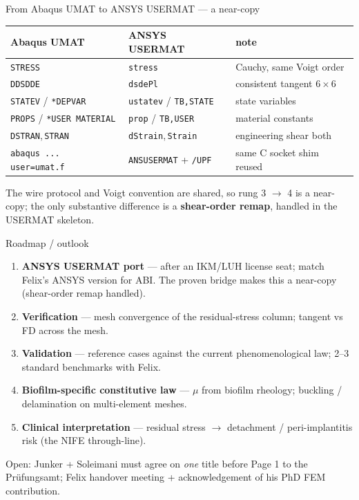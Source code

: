 \documentclass[aspectratio=169,xcolor=dvipsnames]{beamer}
\begin{document}
\begin{frame}{From Abaqus UMAT to ANSYS USERMAT — a near-copy}
\centering
\renewcommand{\arraystretch}{1.2}
\small
\begin{tabular}{l l l}
\hline
\textbf{Abaqus UMAT} & \textbf{ANSYS USERMAT} & \textbf{note}\\
\hline
\texttt{STRESS} & \texttt{stress} & Cauchy, same Voigt order\\
\texttt{DDSDDE} & \texttt{dsdePl} & consistent tangent $6\times6$\\
\texttt{STATEV} / \texttt{*DEPVAR} & \texttt{ustatev} / \texttt{TB,STATE} & state variables\\
\texttt{PROPS} / \texttt{*USER MATERIAL} & \texttt{prop} / \texttt{TB,USER} & material constants\\
\texttt{DSTRAN},\,\texttt{STRAN} & \texttt{dStrain},\,\texttt{Strain} & engineering shear both\\
\texttt{abaqus ... user=umat.f} & \texttt{ANSUSERMAT} + \texttt{/UPF} & same C socket shim reused\\
\hline
\end{tabular}
\vspace{0.6em}

\footnotesize The wire protocol and Voigt convention are shared, so rung 3 $\to$ 4 is a near-copy;
the only substantive difference is a \textbf{shear-order remap}, handled in the USERMAT skeleton.
\end{frame}

\begin{frame}{Roadmap / outlook}
\begin{enumerate}
  \item \textbf{ANSYS USERMAT port} — after an IKM/LUH license seat; match Felix's ANSYS version for
    ABI. The proven bridge makes this a near-copy (shear-order remap handled).
  \item \textbf{Verification} — mesh convergence of the residual-stress column; tangent vs FD across
    the mesh.
  \item \textbf{Validation} — reference cases against the current phenomenological law; 2--3 standard
    benchmarks with Felix.
  \item \textbf{Biofilm-specific constitutive law} — $\mu$ from biofilm rheology; buckling /
    delamination on multi-element meshes.
  \item \textbf{Clinical interpretation} — residual stress $\to$ detachment / peri-implantitis risk
    (the NIFE through-line).
\end{enumerate}
\vspace{0.3em}
\footnotesize Open: Junker + Soleimani must agree on \emph{one} title before Page 1 to the
Prüfungsamt; Felix handover meeting + acknowledgement of his PhD FEM contribution.
\end{frame}
\end{document}
